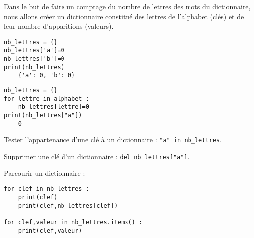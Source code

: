 \begin{exemple}%
Dans le but de faire un comptage du nombre de lettres des mots du dictionnaire, nous allons créer un dictionnaire constitué des lettres de l'alphabet (clés) et de leur nombre d'apparitions (valeurs). 
~\\

\begin{minipage}[c]{.45\linewidth}
\begin{lstlisting}
nb_lettres = {}
nb_lettres['a']=0
nb_lettres['b']=0
print(nb_lettres)
    {'a': 0, 'b': 0}
\end{lstlisting}
\end{minipage}
\hfill
\begin{minipage}[c]{.45\linewidth}
\begin{lstlisting}
nb_lettres = {}
for lettre in alphabet :
    nb_lettres[lettre]=0
print(nb_lettres["a"])
    0
\end{lstlisting}

\end{minipage}

Tester l'appartenance d'une clé à un dictionnaire : \texttt{"a" in nb\_lettres}.

Supprimer une clé d'un dictionnaire : \texttt{del nb\_lettres["a"]}.

Parcourir un dictionnaire : 
\begin{lstlisting}
for clef in nb_lettres :
    print(clef)
    print(clef,nb_lettres[clef])

for clef,valeur in nb_lettres.items() :
    print(clef,valeur)
\end{lstlisting}
\end{exemple}



